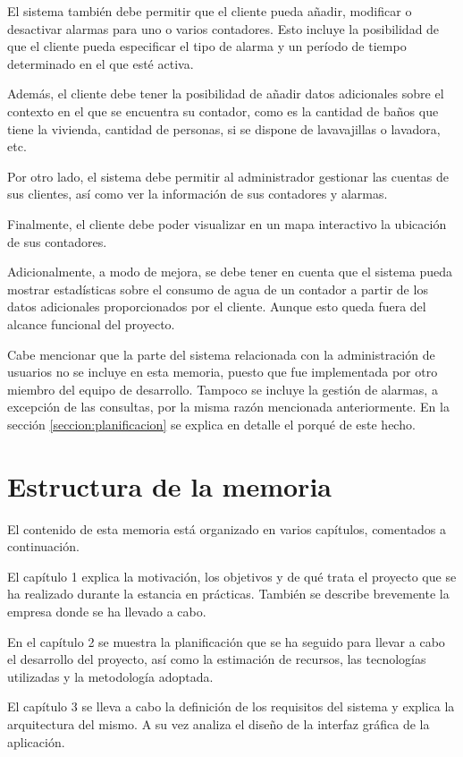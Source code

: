 \documentclass[pdftex,11pt,a4paper]{book}
\begin{document}
El sistema también debe permitir que el cliente pueda añadir, modificar o desactivar alarmas para uno o varios contadores. Esto incluye la posibilidad de que el cliente pueda especificar el tipo de alarma y un período de tiempo determinado en el que esté activa.

Además, el cliente debe tener la posibilidad de añadir datos adicionales sobre el contexto en el que se encuentra su contador, como es la cantidad de baños que tiene la vivienda, cantidad de personas, si se dispone de lavavajillas o lavadora, etc.

Por otro lado, el sistema debe permitir al administrador gestionar las cuentas de sus clientes, así como ver la información de sus contadores y alarmas.

Finalmente, el cliente debe poder visualizar en un mapa interactivo la ubicación de sus contadores.

Adicionalmente, a modo de mejora, se debe tener en cuenta que el sistema pueda mostrar estadísticas sobre el consumo de agua de un contador a partir de los datos adicionales proporcionados por el cliente. Aunque esto queda fuera del alcance funcional del proyecto.

Cabe mencionar que la parte del sistema relacionada con la administración de usuarios no se incluye en esta memoria, puesto que fue implementada por otro miembro del equipo de desarrollo. Tampoco se incluye la gestión de alarmas, a excepción de las consultas, por la misma razón mencionada anteriormente. En la sección \ref{seccion:planificacion} se explica en detalle el porqué de este hecho.


\section{Estructura de la memoria}

El contenido de esta memoria está organizado en varios capítulos, comentados a continuación.

El capítulo 1 explica la motivación, los objetivos y de qué trata el proyecto que se ha realizado durante la estancia en prácticas. También se describe brevemente la empresa donde se ha llevado a cabo.

En el capítulo 2 se muestra la planificación que se ha seguido para llevar a cabo el desarrollo del proyecto, así como la estimación de recursos, las tecnologías utilizadas y la metodología adoptada.

El capítulo 3 se lleva a cabo la definición de los requisitos del sistema y explica la arquitectura del mismo. A su vez analiza el diseño de la interfaz gráfica de la aplicación. 
\end{document}

